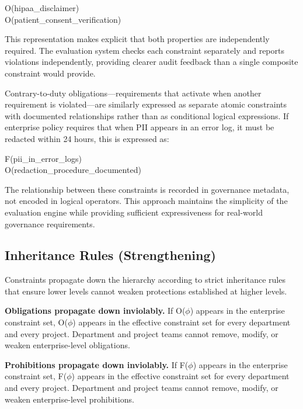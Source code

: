 \begin{claddisp}
O(hipaa\_disclaimer)\\
O(patient\_consent\_verification)
\end{claddisp}


This representation makes explicit that both properties are independently required. The evaluation system checks each constraint separately and reports violations independently, providing clearer audit feedback than a single composite constraint would provide.

Contrary-to-duty obligations---requirements that activate when another requirement is violated---are similarly expressed as separate atomic constraints with documented relationships rather than as conditional logical expressions. If enterprise policy requires that when PII appears in an error log, it must be redacted within 24 hours, this is expressed as:

\begin{claddisp}
F(pii\_in\_error\_logs)\\
O(redaction\_procedure\_documented)
\end{claddisp}


The relationship between these constraints is recorded in governance metadata, not encoded in logical operators. This approach maintains the simplicity of the evaluation engine while providing sufficient expressiveness for real-world governance requirements.

\subsection{Inheritance Rules (Strengthening)}


Constraints propagate down the hierarchy according to strict inheritance rules that ensure lower levels cannot weaken protections established at higher levels.

\textbf{Obligations propagate down inviolably.} If O($\phi$) appears in the enterprise constraint set, O($\phi$) appears in the effective constraint set for every department and every project. Department and project teams cannot remove, modify, or weaken enterprise-level obligations.

\textbf{Prohibitions propagate down inviolably.} If F($\phi$) appears in the enterprise constraint set, F($\phi$) appears in the effective constraint set for every department and every project. Department and project teams cannot remove, modify, or weaken enterprise-level prohibitions.

